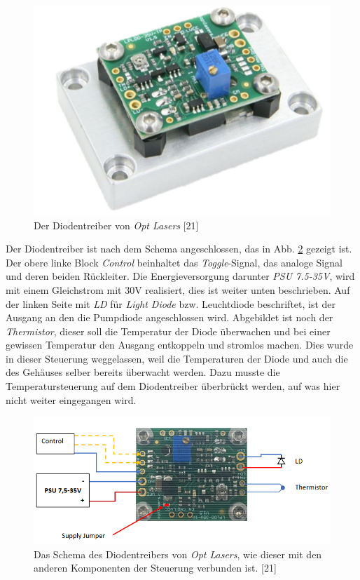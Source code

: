 \begin{figure}[H]
    \centering
    \includegraphics[scale=0.75]{98_images/ldd_optlaser.jpg}
    \caption{Der Diodentreiber von \textit{Opt Lasers} [21]}
    \label{fig:diodentreiber_hw}
\end{figure}

Der Diodentreiber ist nach dem Schema angeschlossen, das in Abb. \ref{fig:diodentreiber_schema_hw} gezeigt ist. Der obere linke Block \textit{Control} beinhaltet das \textit{Toggle}-Signal, das analoge Signal und deren beiden Rückleiter. Die Energieversorgung darunter \textit{PSU 7.5-35V}, wird mit einem Gleichstrom mit 30V realisiert, dies ist weiter unten beschrieben. Auf der linken Seite mit \textit{LD} für \textit{Light Diode}  bzw. Leuchtdiode beschriftet, ist der Ausgang an den die Pumpdiode angeschlossen wird. Abgebildet ist noch der \textit{Thermistor}, dieser soll die Temperatur der Diode überwachen und bei einer gewissen Temperatur den Ausgang entkoppeln und stromlos machen. Dies wurde in dieser Steuerung weggelassen, weil die Temperaturen der Diode und auch die des Gehäuses selber bereits überwacht werden. Dazu musste die Temperatursteuerung auf dem Diodentreiber überbrückt werden, auf was hier nicht weiter eingegangen wird.

\begin{figure}[H]
    \centering
    \includegraphics[scale=0.6, trim={0mm 0mm 0mm 0mm}, clip]{98_images/ldd_schema_connections.PNG}
    \caption{Das Schema des Diodentreibers von \textit{Opt Lasers}, wie dieser mit den anderen Komponenten der Steuerung verbunden ist. [21]}
    \label{fig:diodentreiber_schema_hw}
\end{figure}


